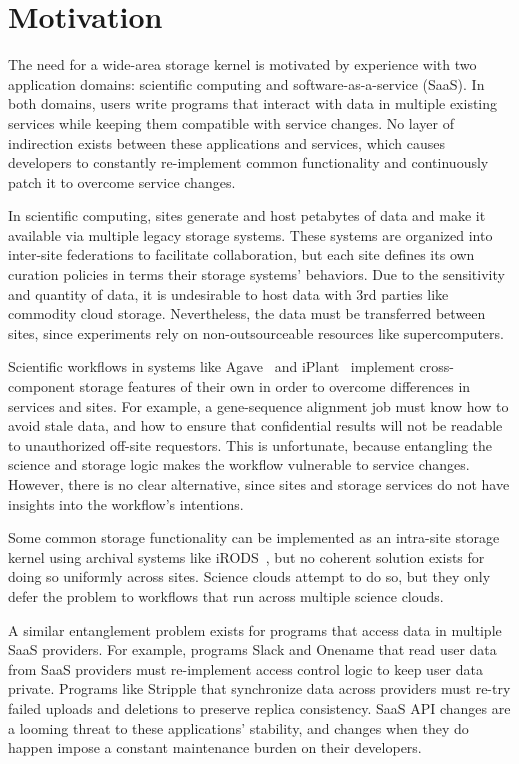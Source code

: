 \section{Motivation}
\label{sec:motivation}

The need for a wide-area storage kernel is motivated by experience with two application domains:
scientific computing and software-as-a-service (SaaS). In both domains, users
write programs that interact with data in multiple existing services while
keeping them compatible with service changes.  No layer of indirection exists
between these applications and services, which causes developers to constantly
re-implement common functionality and continuously patch it to overcome service
changes.

In scientific computing, sites generate and host petabytes of data and make it
available via multiple legacy storage systems.  These systems are organized
into inter-site federations to facilitate collaboration, but each site defines
its own curation policies in terms their storage systems' behaviors. Due
to the sensitivity and quantity of data, it is undesirable to host data with 3rd
parties like commodity cloud storage. Nevertheless, the data must be transferred
between sites, since experiments rely on non-outsourceable resources like
supercomputers.

Scientific workflows in systems like Agave~\cite{agave} and iPlant~\cite{iplant}
implement cross-component storage features of their own in
order to overcome differences in services and sites.  For example, a
gene-sequence alignment job must know how to avoid stale data, and how to ensure
that confidential results will not be readable to unauthorized off-site
requestors. This is unfortunate, because entangling the science and storage
logic makes the workflow vulnerable to service changes.  However, there is no
clear alternative, since sites and storage services do not have insights into
the workflow's intentions.

Some common storage functionality can be implemented as an intra-site storage
kernel using archival systems like iRODS~\cite{irods}, but no
coherent solution exists for doing so uniformly across sites. Science clouds
attempt to do so, but they only defer the problem to workflows that run across
multiple science clouds.

A similar entanglement problem exists for programs that access data in multiple
SaaS providers.  For example, programs Slack and Onename that read user data
from SaaS providers must re-implement access control logic to keep user
data private.  Programs like Stripple that synchronize data across providers
must re-try failed uploads and deletions to preserve replica consistency. 
SaaS API changes are a looming threat to these applications' stability, and 
changes when they do happen impose a constant
maintenance burden on their developers.

